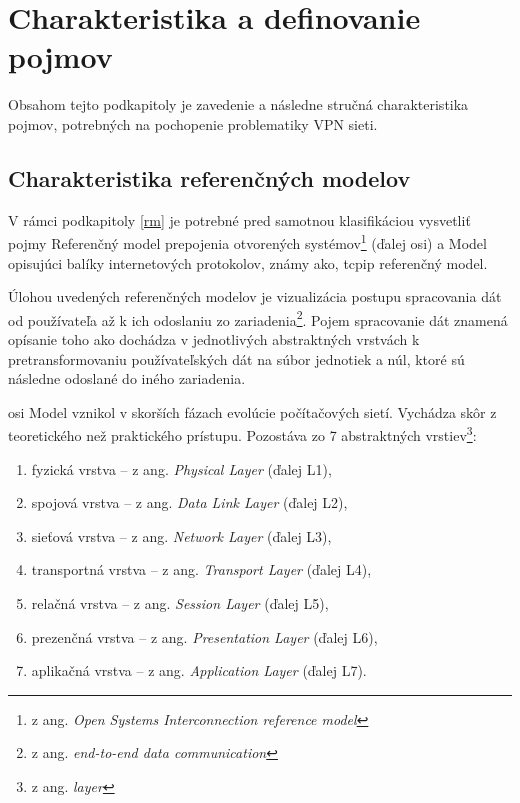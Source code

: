 \section{Charakteristika a definovanie pojmov}
Obsahom tejto podkapitoly je zavedenie a následne stručná charakteristika pojmov, potrebných na pochopenie problematiky VPN sieti.
\subsection{Charakteristika referenčných modelov}\label{crm}
V rámci  podkapitoly \ref{rm} je potrebné pred samotnou klasifikáciou vysvetliť pojmy Referenčný model prepojenia otvorených systémov\footnote{z ang. \textit{Open Systems Interconnection reference model}} (ďalej \acrshort{osi}) a Model opisujúci balíky internetových protokolov, známy ako, \acrshort{tcpip} referenčný model.

Úlohou uvedených referenčných modelov je vizualizácia postupu spracovania dát od používateľa až k ich odoslaniu zo zariadenia\footnote{z ang. \textit{end-to-end data communication}}. Pojem spracovanie dát znamená opísanie toho ako dochádza v jednotlivých abstraktných vrstvách k pretransformovaniu používateľských dát na súbor jednotiek a núl, ktoré sú následne odoslané do iného zariadenia. 

\acrshort{osi} Model vznikol v skorších fázach evolúcie počítačových sietí. Vychádza skôr z teoretického než praktického prístupu. Pozostáva zo 7 abstraktných vrstiev\footnote{z ang. \textit{layer}}:

\begin{enumerate}
	\item{fyzická vrstva} -- z ang. \textit{Physical Layer} (ďalej L1), 
	\item{spojová vrstva} -- z ang. \textit{Data Link Layer} (ďalej L2),
	\item{sieťová vrstva} -- z ang. \textit{Network Layer} (ďalej L3),
	\item{transportná vrstva} -- z ang. \textit{Transport Layer} (ďalej L4),
	\item{relačná vrstva} -- z ang. \textit{Session Layer} (ďalej L5),
	\item{prezenčná vrstva} -- z ang. \textit{Presentation Layer} (ďalej L6),
	\item{aplikačná vrstva} -- z ang. \textit{Application Layer} (ďalej L7).
\end{enumerate}

